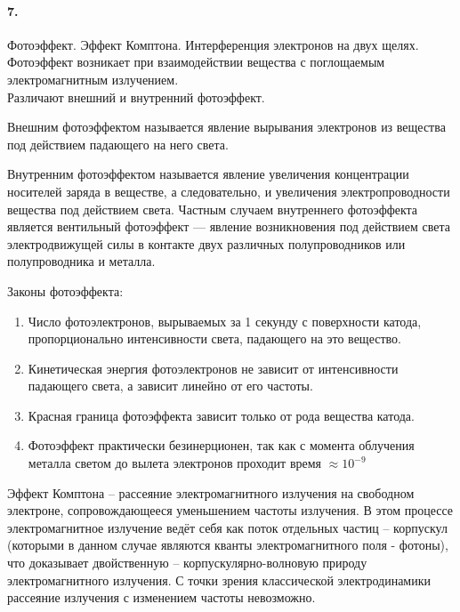 


	\paragraph{7.}
	Фотоэффект. Эффект Комптона. Интерференция электронов на двух щелях.\\
	
	
	Фотоэффект возникает при взаимодействии вещества с поглощаемым электромагнитным излучением.\\
	
	Различают внешний и внутренний фотоэффект.
	
	\begin{definition}
		Внешним фотоэффектом называется явление вырывания электронов из вещества под действием падающего на него света.
	\end{definition}

	\begin{definition}
		Внутренним фотоэффектом называется явление увеличения концентрации носителей заряда в веществе, а следовательно, и увеличения электропроводности вещества под действием света. Частным случаем внутреннего фотоэффекта является вентильный фотоэффект — явление возникновения под действием света электродвижущей силы в контакте двух различных полупроводников или полупроводника и металла.
	\end{definition}

	Законы фотоэффекта:
	
	\begin{enumerate}
		\item Число фотоэлектронов, вырываемых за 1 секунду с поверхности катода, пропорционально интенсивности света, падающего на это вещество.
		\item Кинетическая энергия фотоэлектронов не зависит от интенсивности падающего света, а зависит линейно от его частоты.
		\item Красная граница фотоэффекта зависит только от рода вещества катода.
		\item Фотоэффект практически безинерционен, так как с момента облучения металла светом до вылета электронов проходит время $\approx 10^{-9}$
	\end{enumerate}
	
	\begin{definition}
		Эффект Комптона – рассеяние электромагнитного излучения на свободном электроне, сопровождающееся уменьшением частоты излучения. В этом процессе электромагнитное излучение ведёт себя как поток отдельных частиц – корпускул (которыми в данном случае являются кванты электромагнитного поля - фотоны), что доказывает двойственную – корпускулярно-волновую природу электромагнитного излучения. С точки зрения классической электродинамики рассеяние излучения с изменением частоты невозможно.
	\end{definition}

